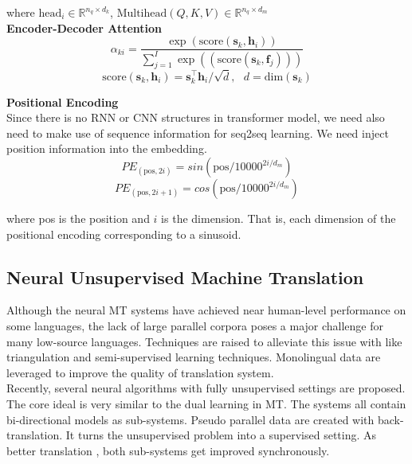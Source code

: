 where  $\text{head}_i \in \mathbb{R}^{n_q \times d_k}$,  ${\text{Multihead}(Q,K,V) \in \mathbb{R}^{n_q \times d_m}}$\\

\textbf{Encoder-Decoder Attention}
\[ \alpha_{ki} = \frac{\exp(\text{score}(\bm{s}_k, \bm{h}_i))}{\sum_{j=1}^{I} \exp((\text{score}(\bm{s}_k, \bm{f}_j)))}\]
\[ \text{score}(\bm{s}_k, \bm{h}_i) = \bm{s}_k^\top \bm{h}_i/\sqrt{d}, \ \ \ d= \text{dim}(\bm{s}_k)\]


\textbf{Positional Encoding}\\
Since there is no RNN or CNN structures in transformer model, we need also need to make use of sequence information for seq2seq learning. We need inject position information into the embedding.
\[PE_{(\text{pos}, 2i)} = sin(\text{pos}/ 10000 ^{2i / d_{m}})\]
\[ PE_{(\text{pos}, 2i+1)} = cos(\text{pos} / 10000^{2i/d_{m}})\]


where pos is the position and $i$ is the dimension. That is, each dimension of the positional encoding corresponding to a sinusoid.






\subsection{Neural Unsupervised Machine Translation}
 Although the neural MT systems have achieved near human-level performance on some languages, the lack of large parallel corpora poses a major challenge for many low-source languages.
 Techniques are raised to alleviate this issue with like triangulation and semi-supervised learning techniques.  Monolingual data are leveraged to improve the quality of translation system. \\
 Recently, several neural algorithms with fully unsupervised settings are proposed. The core ideal is very similar to the dual learning in MT. The systems all contain bi-directional models as sub-systems. Pseudo parallel data are created with back-translation. It turns the unsupervised problem into a supervised setting. As better translation , both sub-systems get improved synchronously.\\
 
